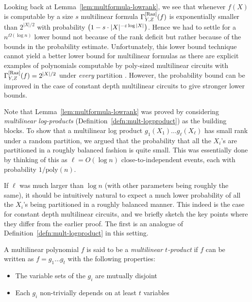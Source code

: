Looking back at Lemma~\ref{lem:multformula-lowrank}, we see that whenever $f(X)$ is computable by a size $s$ multilinear formula $\Gamma^{\mathrm{[Raz]}}_{Y,Z}(f)$ is exponentially smaller than $2^{|X|/2}$ with probability $\left(1 - s\cdot |X|^{-\varepsilon \log |X|}\right)$. Hence we had to settle for a $n^{\Omega(\log n)}$ lower bound not because of the rank deficit but rather because of the bounds in the probability estimate. Unfortunately, this lower bound technique cannot yield a better lower bound for multilinear formulas as there are explicit examples of polynomials computable by poly-sized multilinear circuits with $\Gamma^{\mathrm{[Raz]}}_{Y,Z}(f) = 2^{|X|/2}$ under \emph{every} partition \cite{Raz06}. However, the probability bound can be improved in the case of constant depth multilinear circuits to give stronger lower bounds. 


Note that Lemma~\ref{lem:multformula-lowrank} was proved by considering \emph{multilinear log-products} (Definition~\ref{defn:mult-logproduct}) as the building blocks. To show that a multilinear log product $g_1(X_1)\dots g_{\ell}(X_\ell)$ has small rank under a random partition, we argued that the probability that all the $X_i$'s are partitioned in a roughly balanced fashion is quite small. This was essentially done by thinking of this as $\ell = O(\log n)$ close-to-independent events, each with probability $1/\mathrm{poly}(n)$. 

If $\ell$ was much larger than $\log n$ (with other parameters being roughly the same), it should be intuitively natural to expect a much lower probability of all the $X_i$'s being partitioned in a roughly balanced manner. This indeed is the case for constant depth multilinear circuits, and we briefly sketch the key points where they differ from the earlier proof. The first is an analogue of Definition~\ref{defn:mult-logproduct} in this setting. 

\begin{definition}\label{defn:mult-t-prod}
A multilinear polynomial $f$ is said to be a \emph{multilinear $t$-product} if $f$ can be written as $f = g_1\dots g_t$ with the following properties:
\begin{itemize}
\item The variable sets of the $g_i$ are mutually disjoint
\item Each $g_i$ non-trivially depends on at least $t$ variables
\end{itemize}
\end{definition}


